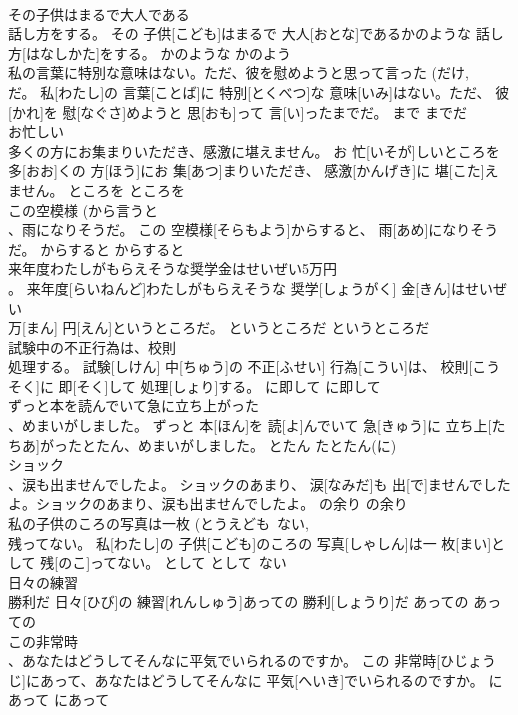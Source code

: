 \documentclass[8pt]{extreport}
\begin{document}
\begin{CJK}{UTF8}{min}
\\	その子供はまるで大人である 
\\	話し方をする。	その 子供[こども]はまるで 大人[おとな]であるかのような 話し方[はなしかた]をする。	かのような	かのよう	
\\	私の言葉に特別な意味はない。ただ、彼を慰めようと思って言った (だけ, 
\\	だ。	私[わたし]の 言葉[ことば]に 特別[とくべつ]な 意味[いみ]はない。ただ、 彼[かれ]を 慰[なぐさ]めようと 思[おも]って 言[い]ったまでだ。	まで	までだ	
\\	お忙しい 
\\	多くの方にお集まりいただき、感激に堪えません。	お 忙[いそが]しいところを 多[おお]くの 方[ほう]にお 集[あつ]まりいただき、 感激[かんげき]に 堪[こた]えません。	ところを	ところを	
\\	この空模様 (から言うと 
\\	、雨になりそうだ。	この 空模様[そらもよう]からすると、 雨[あめ]になりそうだ。	からすると	からすると	
\\	来年度わたしがもらえそうな奨学金はせいぜい5万円 
\\	。	来年度[らいねんど]わたしがもらえそうな 奨学[しょうがく] 金[きん]はせいぜい 
\\	万[まん] 円[えん]というところだ。	というところだ	というところだ	
\\	試験中の不正行為は、校則 
\\	処理する。	試験[しけん] 中[ちゅう]の 不正[ふせい] 行為[こうい]は、 校則[こうそく]に 即[そく]して 処理[しょり]する。	に即して	に即して	
\\	ずっと本を読んでいて急に立ち上がった 
\\	、めまいがしました。	ずっと 本[ほん]を 読[よ]んでいて 急[きゅう]に 立ち上[たちあ]がったとたん、めまいがしました。	とたん	たとたん(に)	
\\	ショック 
\\	、涙も出ませんでしたよ。	ショックのあまり、 涙[なみだ]も 出[で]ませんでしたよ。ショックのあまり、涙も出ませんでしたよ。	の余り	の余り	
\\	私の子供のころの写真は一枚 (とうえども~ない, 
\\	残ってない。	私[わたし]の 子供[こども]のころの 写真[しゃしん]は一 枚[まい]として 残[のこ]ってない。	として	として~ない	
\\	日々の練習 
\\	勝利だ	日々[ひび]の 練習[れんしゅう]あっての 勝利[しょうり]だ	あっての	あっての	
\\	この非常時 
\\	、あなたはどうしてそんなに平気でいられるのですか。	この 非常時[ひじょうじ]にあって、あなたはどうしてそんなに 平気[へいき]でいられるのですか。	にあって	にあって	

\end{CJK}
\end{document}
